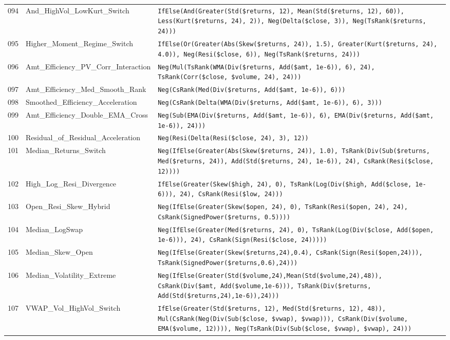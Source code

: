 \begin{longtable}{@{}llp{}@{}}
094 & And\_HighVol\_LowKurt\_Switch & \texttt{IfElse(And(Greater(Std(\$returns, 12), Mean(Std(\$returns, 12), 60)), Less(Kurt(\$returns, 24), 2)), Neg(Delta(\$close, 3)), Neg(TsRank(\$returns, 24)))} \\
095 & Higher\_Moment\_Regime\_Switch & \texttt{IfElse(Or(Greater(Abs(Skew(\$returns, 24)), 1.5), Greater(Kurt(\$returns, 24), 4.0)), Neg(Resi(\$close, 6)), Neg(TsRank(\$returns, 24)))} \\
096 & Amt\_Efficiency\_PV\_Corr\_Interaction & \texttt{Neg(Mul(TsRank(WMA(Div(\$returns, Add(\$amt, 1e-6)), 6), 24), TsRank(Corr(\$close, \$volume, 24), 24)))} \\
097 & Amt\_Efficiency\_Med\_Smooth\_Rank & \texttt{Neg(CsRank(Med(Div(\$returns, Add(\$amt, 1e-6)), 6)))} \\
098 & Smoothed\_Efficiency\_Acceleration & \texttt{Neg(CsRank(Delta(WMA(Div(\$returns, Add(\$amt, 1e-6)), 6), 3)))} \\
099 & Amt\_Efficiency\_Double\_EMA\_Cross & \texttt{Neg(Sub(EMA(Div(\$returns, Add(\$amt, 1e-6)), 6), EMA(Div(\$returns, Add(\$amt, 1e-6)), 24)))} \\
100 & Residual\_of\_Residual\_Acceleration & \texttt{Neg(Resi(Delta(Resi(\$close, 24), 3), 12))} \\
101 & Median\_Returns\_Switch & \texttt{Neg(IfElse(Greater(Abs(Skew(\$returns, 24)), 1.0), TsRank(Div(Sub(\$returns, Med(\$returns, 24)), Add(Std(\$returns, 24), 1e-6)), 24), CsRank(Resi(\$close, 12))))} \\
102 & High\_Log\_Resi\_Divergence & \texttt{IfElse(Greater(Skew(\$high, 24), 0), TsRank(Log(Div(\$high, Add(\$close, 1e-6))), 24), CsRank(Resi(\$low, 24)))} \\
103 & Open\_Resi\_Skew\_Hybrid & \texttt{Neg(IfElse(Greater(Skew(\$open, 24), 0), TsRank(Resi(\$open, 24), 24), CsRank(SignedPower(\$returns, 0.5))))} \\
104 & Median\_LogSwap & \texttt{Neg(IfElse(Greater(Med(\$returns, 24), 0), TsRank(Log(Div(\$close, Add(\$open, 1e-6))), 24), CsRank(Sign(Resi(\$close, 24)))))} \\
105 & Median\_Skew\_Open & \texttt{Neg(IfElse(Greater(Skew(\$returns,24),0.4), CsRank(Sign(Resi(\$open,24))), TsRank(SignedPower(\$returns,0.6),24)))} \\
106 & Median\_Volatility\_Extreme & \texttt{Neg(IfElse(Greater(Std(\$volume,24),Mean(Std(\$volume,24),48)), CsRank(Div(\$amt, Add(\$volume,1e-6))), TsRank(Div(\$returns, Add(Std(\$returns,24),1e-6)),24)))} \\
107 & VWAP\_Vol\_HighVol\_Switch & \texttt{IfElse(Greater(Std(\$returns, 12), Med(Std(\$returns, 12), 48)), Mul(CsRank(Neg(Div(Sub(\$close, \$vwap), \$vwap))), CsRank(Div(\$volume, EMA(\$volume, 12)))), Neg(TsRank(Div(Sub(\$close, \$vwap), \$vwap), 24)))} \\

\end{longtable}
